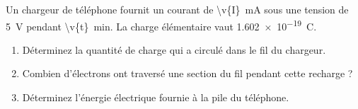 Un chargeur de téléphone fournit un courant de \qty{\v{I}}{mA} sous une tension de \qty{5}{V} pendant \qty{\v{t}}{min}. La charge élémentaire vaut \qty{1.602e-19}{C}.

\begin{enumerate}[label=\alph*)]
    \item Déterminez la quantité de charge qui a circulé dans le fil du chargeur.
    \item Combien d'électrons ont traversé une section du fil pendant cette recharge ?
    \item Déterminez l'énergie électrique fournie à la pile du téléphone.
\end{enumerate}
